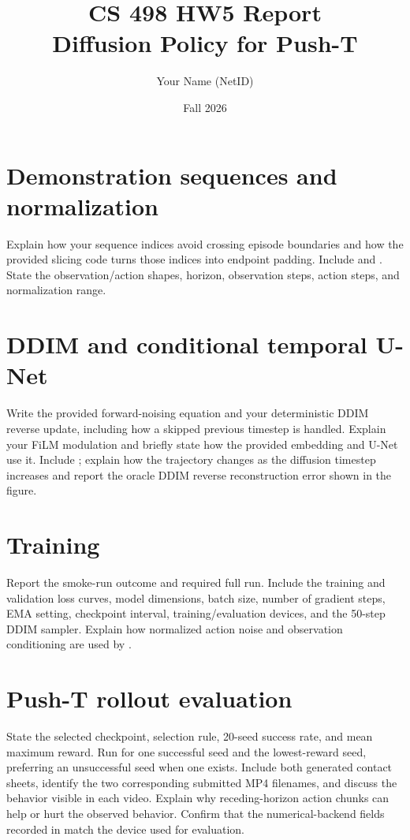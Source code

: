 \documentclass[11pt]{article}
\title{CS 498 HW5 Report\\Diffusion Policy for Push-T}
\author{Your Name (NetID)}
\date{Fall 2026}
\begin{document}
\maketitle

\section{Demonstration sequences and normalization}
Explain how your sequence indices avoid crossing episode boundaries and how
the provided slicing code turns those indices into endpoint padding. Include
 and
. State the observation/action shapes,
horizon, observation steps, action steps, and normalization range.

\section{DDIM and conditional temporal U-Net}
Write the provided forward-noising equation and your deterministic DDIM
reverse update, including how a skipped previous timestep is handled. Explain
your FiLM modulation and briefly state how the provided embedding and U-Net
use it. Include
; explain how the trajectory
changes as the diffusion timestep increases and report the oracle DDIM reverse
reconstruction error shown in the figure.

\section{Training}
Report the smoke-run outcome and required full run. Include the training and
validation loss curves, model dimensions, batch size, number of gradient steps,
EMA setting, checkpoint interval, training/evaluation devices, and the 50-step DDIM sampler. Explain how normalized action noise and
observation conditioning are used by .

\section{Push-T rollout evaluation}
State the selected checkpoint, selection rule, 20-seed success rate, and mean
maximum reward. Run  for one successful
seed and the lowest-reward seed, preferring an unsuccessful seed when one
exists. Include both generated  contact sheets,
identify the two corresponding submitted MP4 filenames, and discuss the
behavior visible in each video. Explain why receding-horizon action chunks can
help or hurt the observed behavior. Confirm that the numerical-backend fields
recorded in  match the device used for evaluation.
\end{document}

